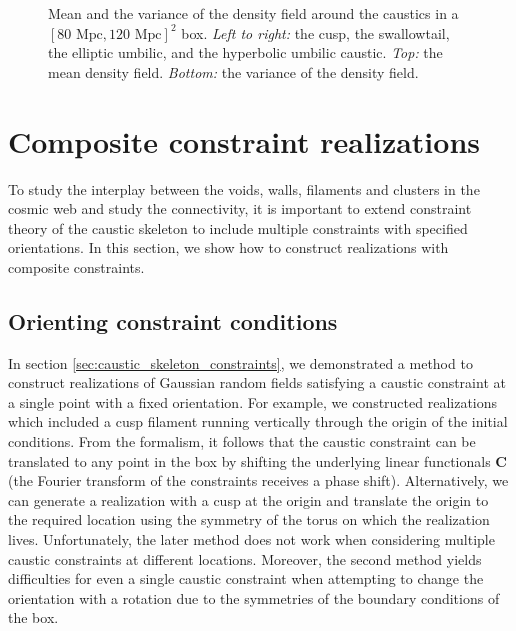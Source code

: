 \documentclass[a4paper, 11pt]{article}
\begin{document}
\begin{figure}
\begin{subfigure}[b]{0.24\textwidth}
\end{subfigure}
\caption{Mean and the variance of the density field around the caustics in a $[80\text{ Mpc},120 \text{ Mpc}]^2$ box. \textit{Left to right:} the cusp, the swallowtail, the elliptic umbilic, and the hyperbolic umbilic caustic. \textit{Top:} the mean density field. \textit{Bottom:} the variance of the density field.}\label{fig:mean_var_dens}
\end{figure}

\section{Composite constraint realizations}\label{sec:composite_constraints}
To study the interplay between the voids, walls, filaments and clusters in the cosmic web and study the connectivity, it is important to extend constraint theory of the caustic skeleton to include multiple constraints with specified orientations. In this section, we show how to construct realizations with composite constraints.

\subsection{Orienting constraint conditions}\label{sec:orientation}
In section \ref{sec:caustic_skeleton_constraints}, we demonstrated a method to construct realizations of Gaussian random fields satisfying a caustic constraint at a single point with a fixed orientation. For example, we constructed realizations which included a cusp filament running vertically through the origin of the initial conditions. From the formalism, it follows that the caustic constraint can be translated to any point in the box by shifting the underlying linear functionals $\bm{C}$ (the Fourier transform of the constraints receives a phase shift). Alternatively, we can generate a realization with a cusp at the origin and translate the origin to the required location using the symmetry of the torus on which the realization lives. Unfortunately, the later method does not work when considering multiple caustic constraints at different locations. Moreover, the second method yields difficulties for even a single caustic constraint when attempting to change the orientation with a rotation due to the symmetries of the boundary conditions of the box.
\end{document}
